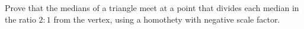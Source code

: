 Prove that the medians of a triangle meet at a point that divides each median in the ratio $2:1$ from the vertex, using a homothety with negative scale factor.
